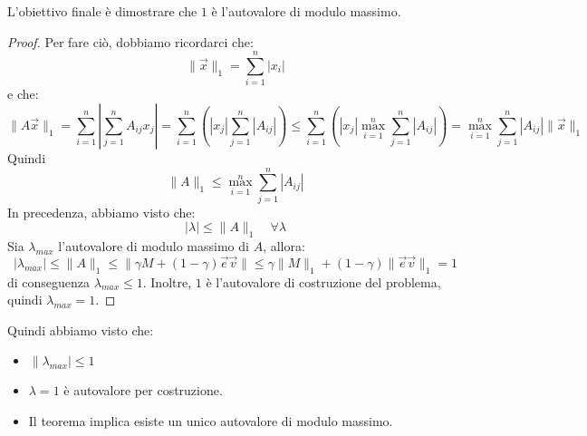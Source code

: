 L'obiettivo finale è dimostrare che $1$ è l'autovalore di modulo massimo.
\begin{proof}
    Per fare ciò, dobbiamo ricordarci che:
    \begin{equation}
        \| \vec{x} \|_1 = \sum_{i = 1}^n |x_i|
    \end{equation}
    e che:
    \begin{equation}
        \| A \vec{x} \|_1 = \sum_{i = 1}^n \left| \sum_{j = 1}^n A_{ij} x_j \right| =
        \sum_{i = 1}^n \left(|x_j| \sum_{j = 1}^n |A_{ij}|\right) \leq
        \sum_{i = 1}^n \left(|x_j| \max_{i = 1}^n \sum_{j = 1}^n |A_{ij}|\right) =
        \max_{i = 1}^n \sum_{j = 1}^n |A_{ij}| \| \vec{x} \|_1
    \end{equation}
    Quindi
    \begin{equation}
        \|A\|_1 \leq \max_{i = 1}^n \sum_{j = 1}^n |A_{ij}|
    \end{equation}
    In precedenza, abbiamo visto che:
    \begin{equation*}
        |\lambda| \leq \|A\|_1 \quad \forall \lambda
    \end{equation*}
    Sia $\lambda_{max}$ l'autovalore di modulo massimo di $A$, allora:
    \begin{equation}
        |\lambda_{max}| \leq \|A\|_1 \leq \|\gamma M + (1 - \gamma) \vec{e} \vec{v}\|
        \leq \gamma \|M\|_1 + (1 - \gamma) \|\vec{e} \vec{v}\|_1 = 1
    \end{equation}
    di conseguenza $\lambda_{max} \leq 1$. Inoltre, $1$ è l'autovalore di costruzione
    del problema, quindi $\lambda_{max} = 1$.
\end{proof}
Quindi abbiamo visto che:
\begin{itemize}
    \item $\|\lambda_{max} | \leq 1$
    \item $\lambda = 1$ è autovalore per costruzione.
    \item Il teorema implica esiste un unico autovalore di modulo massimo.
\end{itemize}

